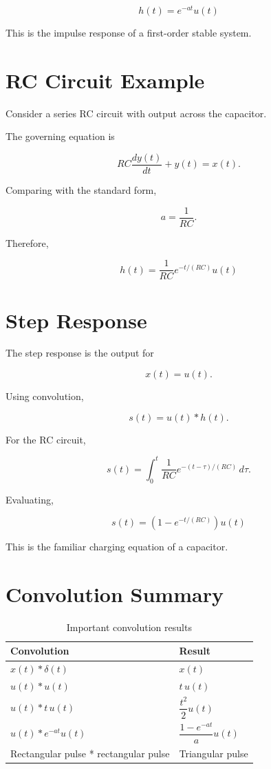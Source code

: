 \[
\boxed{
h(t)=e^{-at}u(t)
}
\]

This is the impulse response of a first-order stable system.


\section{RC Circuit Example}

Consider a series RC circuit with output across the capacitor.

The governing equation is

\[
RC\frac{dy(t)}{dt}+y(t)=x(t).
\]

Comparing with the standard form,

\[
a=\frac{1}{RC}.
\]

Therefore,

\[
\boxed{
h(t)=\frac{1}{RC}e^{-t/(RC)}u(t)
}
\]


\section{Step Response}

The step response is the output for

\[
x(t)=u(t).
\]

Using convolution,

\[
s(t)=u(t)*h(t).
\]

For the RC circuit,

\[
s(t)=
\int_0^t
\frac{1}{RC}e^{-(t-\tau)/(RC)}\,d\tau.
\]

Evaluating,

\[
\boxed{
s(t)=\left(1-e^{-t/(RC)}\right)u(t)
}
\]

This is the familiar charging equation of a capacitor.


\section{Convolution Summary}

\begin{table}[H]
\centering
\caption{Important convolution results}
\begin{tabular}{|p{6cm}|p{5cm}|}
\hline
\textbf{Convolution} & \textbf{Result} \\
\hline
\(x(t)*\delta(t)\) & \(x(t)\) \\
\hline
\(u(t)*u(t)\) & \(t\,u(t)\) \\
\hline
\(u(t)*t\,u(t)\) & \(\dfrac{t^2}{2}u(t)\) \\
\hline
\(u(t)*e^{-at}u(t)\) & \(\dfrac{1-e^{-at}}{a}u(t)\) \\
\hline
Rectangular pulse * rectangular pulse & Triangular pulse \\
\hline
\end{tabular}
\end{table}

